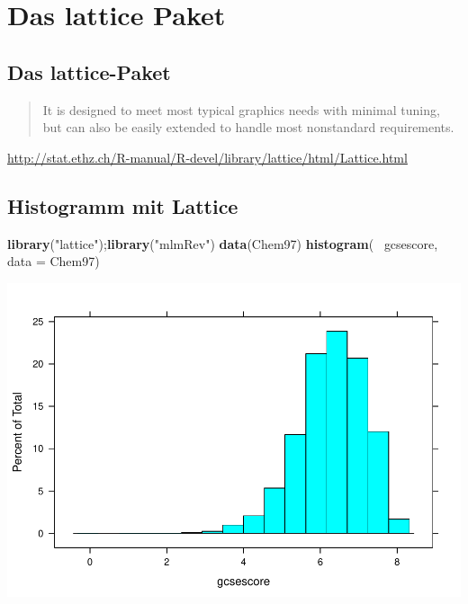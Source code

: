 \documentclass[]{article}
\newenvironment{Shaded}{\begin{snugshade}}{\end{snugshade}}
\newcommand{\KeywordTok}[1]{\textcolor[rgb]{0.13,0.29,0.53}{\textbf{{#1}}}}
\newcommand{\DataTypeTok}[1]{\textcolor[rgb]{0.13,0.29,0.53}{{#1}}}
\newcommand{\StringTok}[1]{\textcolor[rgb]{0.31,0.60,0.02}{{#1}}}
\newcommand{\NormalTok}[1]{{#1}}
\begin{document}
\section{Das lattice Paket}\label{das-lattice-paket}

\subsection{Das lattice-Paket}\label{das-lattice-paket-1}

\begin{quote}
It is designed to meet most typical graphics needs with minimal tuning,
but can also be easily extended to handle most nonstandard requirements.
\end{quote}

\url{http://stat.ethz.ch/R-manual/R-devel/library/lattice/html/Lattice.html}

\subsection{Histogramm mit Lattice}\label{histogramm-mit-lattice}

\begin{Shaded}
\begin{Highlighting}[]
\KeywordTok{library}\NormalTok{(}\StringTok{"lattice"}\NormalTok{);}\KeywordTok{library}\NormalTok{(}\StringTok{"mlmRev"}\NormalTok{)}
\KeywordTok{data}\NormalTok{(Chem97)}
\KeywordTok{histogram}\NormalTok{(~}\StringTok{ }\NormalTok{gcsescore, }\DataTypeTok{data =} \NormalTok{Chem97)}
\end{Highlighting}
\end{Shaded}

\includegraphics{Intro_Datenanalyse1_files/figure-latex/unnamed-chunk-171-1.pdf}
\end{document}
